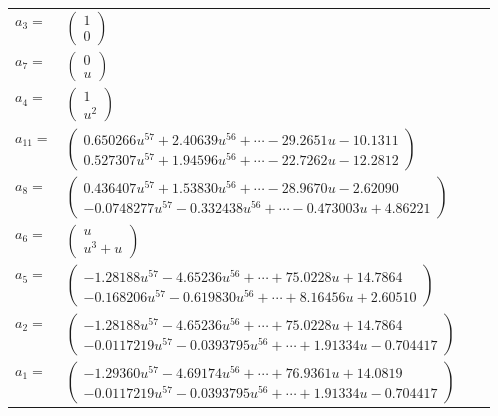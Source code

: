 \documentclass[1p]{elsarticle_modified}
\theoremstyle{definition}
\begin{document}
\begin{tabular}{m{7pt} m{180pt} m{7pt} m{180pt} }
\flushright $a_{3}=$&$\begin{pmatrix}1\\0\end{pmatrix}$ \\
\flushright $a_{7}=$&$\begin{pmatrix}0\\u\end{pmatrix}$ \\
\flushright $a_{4}=$&$\begin{pmatrix}1\\u^2\end{pmatrix}$ \\
\flushright $a_{11}=$&$\begin{pmatrix}0.650266 u^{57}+2.40639 u^{56}+\cdots-29.2651 u-10.1311\\0.527307 u^{57}+1.94596 u^{56}+\cdots-22.7262 u-12.2812\end{pmatrix}$ \\
\flushright $a_{8}=$&$\begin{pmatrix}0.436407 u^{57}+1.53830 u^{56}+\cdots-28.9670 u-2.62090\\-0.0748277 u^{57}-0.332438 u^{56}+\cdots-0.473003 u+4.86221\end{pmatrix}$ \\
\flushright $a_{6}=$&$\begin{pmatrix}u\\u^3+u\end{pmatrix}$ \\
\flushright $a_{5}=$&$\begin{pmatrix}-1.28188 u^{57}-4.65236 u^{56}+\cdots+75.0228 u+14.7864\\-0.168206 u^{57}-0.619830 u^{56}+\cdots+8.16456 u+2.60510\end{pmatrix}$ \\
\flushright $a_{2}=$&$\begin{pmatrix}-1.28188 u^{57}-4.65236 u^{56}+\cdots+75.0228 u+14.7864\\-0.0117219 u^{57}-0.0393795 u^{56}+\cdots+1.91334 u-0.704417\end{pmatrix}$ \\
\flushright $a_{1}=$&$\begin{pmatrix}-1.29360 u^{57}-4.69174 u^{56}+\cdots+76.9361 u+14.0819\\-0.0117219 u^{57}-0.0393795 u^{56}+\cdots+1.91334 u-0.704417\end{pmatrix}$ \\

\end{tabular}
\end{document}
